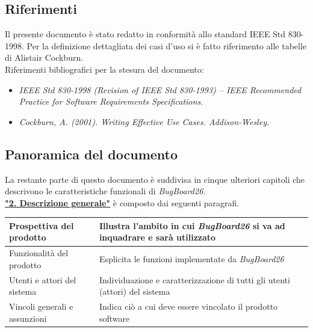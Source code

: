 \documentclass[a4paper,12pt]{article}
\begin{document}
\subsection{Riferimenti}
Il presente documento è stato redatto in conformità allo standard IEEE Std 830-1998. 
Per la definizione dettagliata dei casi d’uso si è fatto riferimento alle tabelle di Alistair Cockburn.\\
Riferimenti bibliografici per la stesura del documento:
\begin{itemize}
    \item \textit{IEEE Std 830-1998 (Revision of IEEE Std 830-1993) – IEEE Recommended Practice for Software Requirements Specifications.}
    \item \textit{Cockburn, A. (2001). Writing Effective Use Cases. Addison-Wesley.}
\end{itemize}
\subsection{Panoramica del documento}
La restante parte di questo documento è suddivisa in cinque ulteriori capitoli che descrivono le caratteristiche funzionali di \textit{BugBoard26}.\\
\hyperref[sec:descrizioneGenerale]{\textbf{"2. Descrizione generale"}} è composto dai seguenti paragrafi.
\begin{longtable}{|p{5cm}|p{9cm}|}
\hline
Prospettiva del prodotto & Illustra l'ambito in cui \textit{BugBoard26} si va ad inquadrare e sarà utilizzato\\ \hline
Funzionalità del prodotto & Esplicita le funzioni implementate da \textit{BugBoard26} \\ \hline
Utenti e attori del sistema & Individuazione e caratterizzazione di tutti gli utenti (attori) del sistema \\ \hline
Vincoli generali e assunzioni & Indica ciò a cui deve essere vincolato il prodotto software \\ \hline
\end{longtable}
\end{document}
